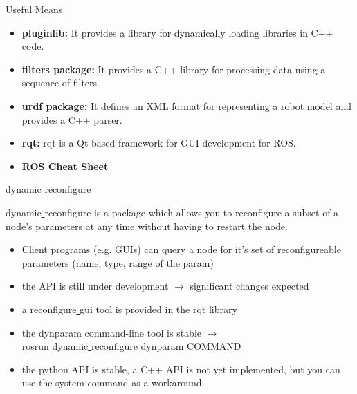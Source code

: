 \documentclass{beamer}
\begin{document}
\begin{frame}{Useful Means}
	
	\begin{itemize}
		\item \textbf{pluginlib:} It provides a library for dynamically loading libraries in C++ code. 
		
		\item \textbf{filters package:} It provides a C++ library for processing data using a sequence of filters.
		
		\item \textbf{urdf package:} It defines an XML format for representing a robot model and provides a C++ parser. 
		
		\item \textbf{rqt:} rqt is a Qt-based framework for GUI development for ROS. 
		
		\item \textbf{ROS Cheat Sheet}
		
	\end{itemize}
	
\end{frame}

\begin{frame}{dynamic\underline{ }reconfigure}
	\begin{definition}
		dynamic\underline{ }reconfigure is a package which allows you to reconfigure a subset of a node's parameters at any time without having to restart the node. 
	\end{definition}
	
	\begin{itemize}

		\item Client programs (e.g. GUIs) can query a node for it's set of reconfigureable parameters (name, type, range of the param)
		
		\item the API is still under development $\rightarrow$ significant changes expected
		
		\item a reconfigure\underline{ }gui tool is provided in the rqt library
		
		\item the dynparam command-line tool is stable $\rightarrow$ \\
		rosrun dynamic\underline{ }reconfigure dynparam COMMAND
		
		\item the python API is stable, a C++ API is not yet implemented, but you can use the system command as a workaround. 
		
		
	\end{itemize}
	
	
	
\end{frame}
\end{document}
